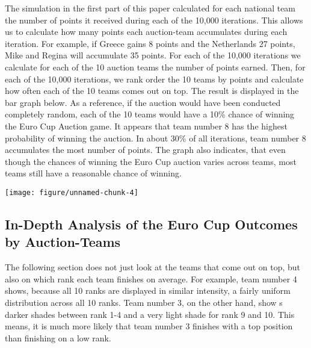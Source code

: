 \documentclass{article}\usepackage[]{graphicx}\usepackage[]{color}
\makeatletter
\def\maxwidth{ %
  \ifdim\Gin@nat@width>\linewidth
    \linewidth
  \else
    \Gin@nat@width
  \fi
}
\newenvironment{knitrout}{}{} %
\makeatother
\begin{document}
The simulation in the first part of this paper calculated for each national team the number of points it received during each of the 10,000 iterations. This allows us to calculate how many points each auction-team accumulates during each iteration. For example, if Greece gains 8 points and the Netherlands 27 points, Mike and Regina will accumulate 35 points. For each of the 10,000 iterations we calculate for each of the 10 auction teams the number of points earned. Then, for each of the 10,000 iterations, we rank order the 10 teams by points and calculate how often each of the 10 teams comes out on top. The result is displayed in the bar graph below. As a reference, if the auction would have been conducted completely random, each of the 10 teams would have a 10\% chance of winning the Euro Cup Auction game. It appears that team number 8 has the highest probability of winning the auction. In about 30\% of all iterations, team number 8 accumulates the most number of points. The graph also indicates, that even though the chances of winning the Euro Cup auction varies across teams, most teams still have a reasonable chance of winning.


\vspace{15mm}

\begin{knitrout}
\color{fgcolor}
\texttt{[image: figure/unnamed-chunk-4]} 

\end{knitrout}


\subsection{In-Depth Analysis of the Euro Cup Outcomes by Auction-Teams}

The following section does not just look at the teams that come out on top, but also on which rank each team finishes on average. For example, team number 4 shows, because all 10 ranks are displayed in similar intensity, a fairly uniform distribution across all 10 ranks. Team number 3, on the other hand, show s darker shades between rank 1-4 and a very light shade for rank 9 and 10. This means, it is much more likely that team number 3 finishes with a top position than finishing on a low rank. 
\end{document}
